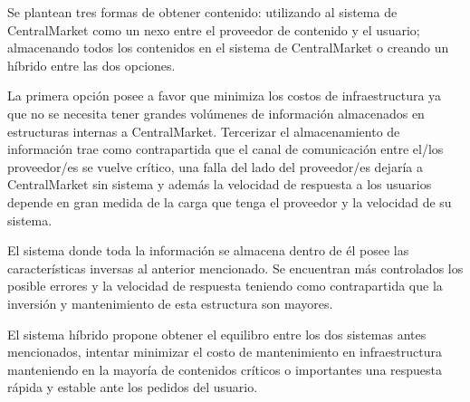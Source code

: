 \documentclass[11pt, a4paper, spanish]{article}
\begin{document}
	Se plantean tres formas de obtener contenido: utilizando al sistema de CentralMarket como un nexo entre el proveedor de contenido y el usuario; almacenando todos los contenidos en el sistema de CentralMarket o creando un h\'ibrido entre las dos opciones.

	La primera opci\'on posee a favor que minimiza los costos de infraestructura ya que no se necesita tener grandes vol\'umenes de informaci\'on almacenados en estructuras internas a CentralMarket. Tercerizar el almacenamiento de informaci\'on trae como contrapartida que el canal de comunicaci\'on entre el/los proveedor/es se vuelve cr\'itico, una falla del lado del proveedor/es dejar\'ia a CentralMarket sin sistema y adem\'as la velocidad de respuesta a los usuarios depende en gran medida de la carga que tenga el proveedor y la velocidad de su sistema. 

	El sistema donde toda la informaci\'on se almacena dentro de \'el posee las caracter\'isticas inversas al anterior mencionado. Se encuentran m\'as controlados los posible errores y la velocidad de respuesta teniendo como contrapartida que la inversi\'on y mantenimiento de esta estructura son mayores. 

	El sistema h\'ibrido propone obtener el equilibro entre los dos sistemas antes mencionados, intentar minimizar el costo de mantenimiento en infraestructura manteniendo en la mayor\'ia de contenidos cr\'iticos o importantes una respuesta r\'apida y estable ante los pedidos del usuario.
\end{document}
